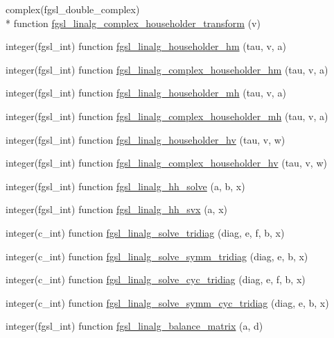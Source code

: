 \begin{DoxyCompactItemize}
\item 
complex(fgsl\-\_\-double\-\_\-complex) \\*
function \hyperlink{linalg_8finc_a7bd1bfa2419818da7392462ec4e51a49}{fgsl\-\_\-linalg\-\_\-complex\-\_\-householder\-\_\-transform} (v)
\item 
integer(fgsl\-\_\-int) function \hyperlink{linalg_8finc_abbaccde9508cf3805e8fd920e086b306}{fgsl\-\_\-linalg\-\_\-householder\-\_\-hm} (tau, v, a)
\item 
integer(fgsl\-\_\-int) function \hyperlink{linalg_8finc_a6cfd891d07d48aa2404785b7607a8ca1}{fgsl\-\_\-linalg\-\_\-complex\-\_\-householder\-\_\-hm} (tau, v, a)
\item 
integer(fgsl\-\_\-int) function \hyperlink{linalg_8finc_a0215003deddc89a15be1533dcfadd837}{fgsl\-\_\-linalg\-\_\-householder\-\_\-mh} (tau, v, a)
\item 
integer(fgsl\-\_\-int) function \hyperlink{linalg_8finc_a3c2d047dceeba00601c6a049eedb7c58}{fgsl\-\_\-linalg\-\_\-complex\-\_\-householder\-\_\-mh} (tau, v, a)
\item 
integer(fgsl\-\_\-int) function \hyperlink{linalg_8finc_af93afe6e7341885e9672d74b4d113c62}{fgsl\-\_\-linalg\-\_\-householder\-\_\-hv} (tau, v, w)
\item 
integer(fgsl\-\_\-int) function \hyperlink{linalg_8finc_a577aa9f2f2795c9d8d545502e0baae34}{fgsl\-\_\-linalg\-\_\-complex\-\_\-householder\-\_\-hv} (tau, v, w)
\item 
integer(fgsl\-\_\-int) function \hyperlink{linalg_8finc_a0da76044dd77df2922422968347c1d00}{fgsl\-\_\-linalg\-\_\-hh\-\_\-solve} (a, b, x)
\item 
integer(fgsl\-\_\-int) function \hyperlink{linalg_8finc_ae4d2e360e54f77fbdef78af0fd6c8348}{fgsl\-\_\-linalg\-\_\-hh\-\_\-svx} (a, x)
\item 
integer(c\-\_\-int) function \hyperlink{linalg_8finc_ad5daaa9a613e3d9e8668191df02d1d85}{fgsl\-\_\-linalg\-\_\-solve\-\_\-tridiag} (diag, e, f, b, x)
\item 
integer(c\-\_\-int) function \hyperlink{linalg_8finc_a91cd2d731729955df9677ae3e44b4799}{fgsl\-\_\-linalg\-\_\-solve\-\_\-symm\-\_\-tridiag} (diag, e, b, x)
\item 
integer(c\-\_\-int) function \hyperlink{linalg_8finc_a3a0cc14d7736d7e20be30ed7f07f093e}{fgsl\-\_\-linalg\-\_\-solve\-\_\-cyc\-\_\-tridiag} (diag, e, f, b, x)
\item 
integer(c\-\_\-int) function \hyperlink{linalg_8finc_aea909b87fb81242ac465f6651e63f536}{fgsl\-\_\-linalg\-\_\-solve\-\_\-symm\-\_\-cyc\-\_\-tridiag} (diag, e, b, x)
\item 
integer(fgsl\-\_\-int) function \hyperlink{linalg_8finc_a82232b7f631cacda2a903f1d0fae1263}{fgsl\-\_\-linalg\-\_\-balance\-\_\-matrix} (a, d)
\end{DoxyCompactItemize}



